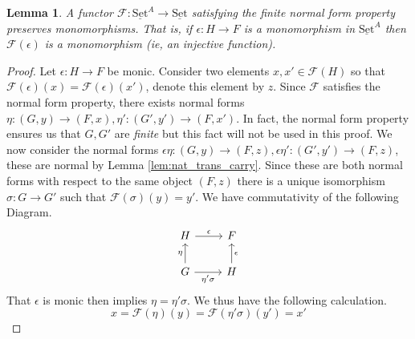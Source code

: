 \documentclass[12pt]{article}
\theoremstyle{plain}
\newtheorem{lemma}[thm]{Lemma}
\theoremstyle{definition}
\newcommand{\scr}[1]{\mathscr{#1}}
\newcommand{\lto}{\longrightarrow}
\newcommand{\set}{\operatorname{\underline{Set}}}
\begin{document}
	\begin{lemma}
		A functor $\scr{F}: \set^A \lto \set$ satisfying the finite normal form property preserves monomorphisms. That is, if $\epsilon: H \lto F$ is a monomorphism in $\set^A$ then $\scr{F}(\epsilon)$ is a monomorphism (ie, an injective function).
		\end{lemma}
	\begin{proof}
		Let $\epsilon: H \lto F$ be monic. Consider two elements $x,x' \in \scr{F}(H)$ so that $\scr{F}(\epsilon)(x) = \scr{F}(\epsilon)(x')$, denote this element by $z$. Since $\scr{F}$ satisfies the normal form property, there exists normal forms $\eta: (G, y) \lto (F,x), \eta': (G',y') \lto (F,x')$. In fact, the normal form property ensures us that $G,G'$ are \emph{finite} but this fact will not be used in this proof. We now consider the normal forms $\epsilon \eta: (G, y) \lto (F,z), \epsilon \eta': (G', y') \lto (F,z)$, these are normal by Lemma \ref{lem:nat_trans_carry}. Since these are both normal forms with respect to the same object $(F,z)$ there is a unique isomorphism $\sigma: G \lto G'$ such that $\scr{F}(\sigma)(y) = y'$. We have commutativity of the following Diagram.
		\begin{equation}
			\begin{tikzcd}
				H\arrow[r,"{\epsilon}"] & F\\
				G\arrow[u,"{\eta}"]\arrow[r,swap,"{\eta' \sigma}"] & H\arrow[u,swap,"{\epsilon}"]
				\end{tikzcd}
			\end{equation}
		That $\epsilon$ is monic then implies $\eta = \eta' \sigma$. We thus have the following calculation.
		\begin{equation}
			x = \scr{F}(\eta)(y) = \scr{F}(\eta' \sigma)(y') = x'
			\end{equation}
		\end{proof}
	
\end{document}
